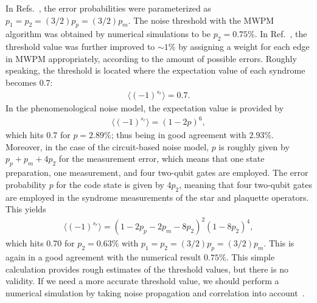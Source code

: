 In Refs.~\cite{RaussendorfAnn,RaussendorfNJP,RaussendorfPRL}, the error probabilities were parameterized as $p_1 = p_2 = (3/2)p_p= (3/2)p_m$.
The noise threshold with the MWPM algorithm was obtained by numerical simulations to be $p_2 = 0.75\%$.
In Ref.~\cite{WangFowler}, the threshold value was further improved to $\sim 1\%$ by assigning a weight for each edge in MWPM appropriately, according to the amount of possible errors.
Roughly speaking, the threshold is located where the expectation value of each syndrome becomes $0.7$:
\begin{eqnarray}
\langle (-1)^{s_r} \rangle = 0.7.
\end{eqnarray}
In the phenomenological noise model, the expectation value is provided by
\begin{eqnarray}
\langle (-1)^{s_r} \rangle = (1-2p)^6,
\end{eqnarray}
which hits $0.7$ for $p=2.89\%$; thus being in good agreement with $2.93\%$.
Moreover, in the case of the circuit-based noise model, $p$ is roughly given by $p_p+p_m+4p_2$ for the measurement error, which means that one state preparation, one measurement, and four two-qubit gates are employed.
The error probability $p$ for the code state is given by $4p_2$, meaning that four two-qubit gates are employed in the syndrome measurements of the star and plaquette operators.
This yields
\begin{eqnarray}
\langle (-1)^{s_r} \rangle = (1-2p_p-2p_m-8p_2)^2 (1-8p_2)^4,
\end{eqnarray}
which hits 0.70 for $p_2 = 0.63\%$ with $p_1 = p_2 = (3/2)p_p= (3/2)p_m$.
This is again in a good agreement with the numerical result $0.75\%$.
This simple calculation provides rough estimates of the threshold values, but there is no validity.
If we need a more accurate threshold value, we should perform a numerical simulation by taking noise propagation and correlation into account~\cite{RaussendorfNJP,WangFowler}.


